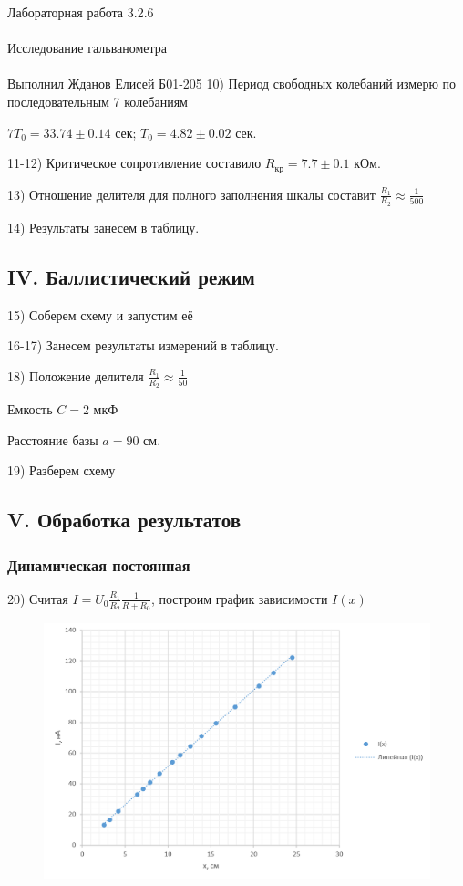 \documentclass{astroedu-lab}
\begin{document}
\begin{problem}{\huge Лабораторная работа 3.2.6\\\\Исследование гальванометра\\\\Выполнил Жданов Елисей Б01-205}
10) Период свободных колебаний измерю по последовательным 7 колебаниям

$7 T_0 = 33.74 \pm 0.14$ сек; $T_0 = 4.82 \pm 0.02$ сек.

11-12) Критическое сопротивление составило $R_\text{кр} = 7.7 \pm 0.1$ кОм.

13) Отношение делителя для полного заполнения шкалы составит $\frac{R_1}{R_2} \approx \frac{1}{500}$

14) Результаты занесем в таблицу.

\subsection{IV. Баллистический режим}

15) Соберем схему и запустим её

16-17) Занесем результаты измерений в таблицу.

18) Положение делителя $\frac{R_1}{R_2} \approx \frac{1}{50}$

Емкость $C = 2$ мкФ

Расстояние базы $a = 90$ см.

19) Разберем схему

\subsection{V. Обработка результатов}

\subsubsection{Динамическая постоянная}

20) Считая $I = U_0 \frac{R_1}{R_2}\frac{1}{R + R_0}$, построим график зависимости $I(x)$

\begin{figure}[!h]
	\centering
	\includegraphics[width=1\textwidth]{граф1.png}
	\label{fig:boiler}
\end{figure}


\end{problem}
\end{document}
